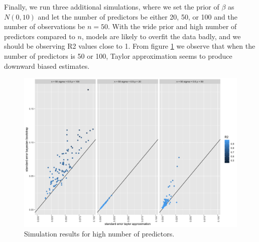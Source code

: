 \documentclass{article}
\begin{document}
Finally, we run three additional simulations, where we set the prior of $\beta$ as $N(0, 10)$ and let the number of predictors be either 20, 50, or 100 and the number of observations be $n = 50$. With the wide prior and high number of predictors compared to $n$, models are likely to overfit the data badly, and we should be observing R2 values close to 1. From figure \ref{fig:simres_high_p} we observe that when the number of predictors is 50 or 100, Taylor approximation seems to produce downward biased estimates.

\begin{figure}
    \centering
    \includegraphics[width=\textwidth]{simres_high_p_n50.png}
    \caption{ Simulation results for high number of predictors.}
    \label{fig:simres_high_p}
\end{figure}

\newpage


\end{document}
